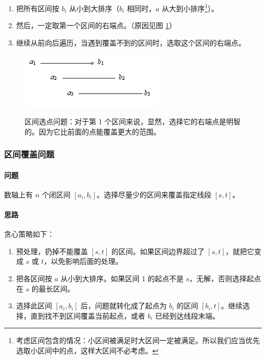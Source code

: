 	\begin{enumerate}
		\item 把所有区间按 $b_i$ 从小到大排序（$b_i$ 相同时，$a$ 从大到小排序\footnote{考虑区间包含的情况：小区间被满足时大区间一定被满足。所以我们应当优先选取小区间中的点，这样大区间不必考虑。}）。
		\item 然后，一定取第一个区间的右端点。（原因见图 \ref{fig:ch1_tx_qjsdwt_2}）
		\item 继续从前向后遍历，当遇到覆盖不到的区间时，选取这个区间的右端点。
	\end{enumerate}
	
	\begin{figure}[htb]
		\centering
		\includegraphics{ch1/figures/区间选点问题.png}
		\label{fig:ch1_tx_qjsdwt_2}
		\caption{区间选点问题：对于第 1 个区间来说，显然，选择它的右端点是明智的。因为它比前面的点能覆盖更大的范围。}
	\end{figure}

\subsubsection{区间覆盖问题}
	\paragraph{问题} 数轴上有 $n$ 个闭区间 $[a_i, b_i]$。选择尽量少的区间来覆盖指定线段 $[s, t]$。

	\paragraph{思路} 贪心策略如下：
	
	\begin{enumerate}
		\item 预处理，扔掉不能覆盖 $[s, t]$ 的区间。如果区间边界超过了 $[s, t]$，就把它变成 $s$ 或 $t$，以免影响后面的处理。
		\item 把各区间按 $a$ 从小到大排序。如果区间 1 的起点不是 $s$，无解，否则选择起点在 $s$ 的最长区间。
		\item 选择此区间 $[a_i, b_i]$ 后，问题就转化成了起点为 $b_i$ 的区间 $[b_i, t]$。继续选择，直到找不到区间覆盖当前起点，或者 $b_i$ 已经到达线段末端。
	\end{enumerate}
	
	
	